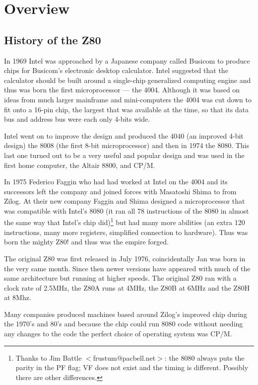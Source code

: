 \documentclass[oneside,a4paper]{book}
\begin{document}
\chapter{Overview}

\section{History of the Z80}

In 1969 Intel was approached by a Japanese company called Busicom to produce  chips for Busicom's electronic desktop calculator. Intel suggested that the calculator should be built around a single-chip generalized computing engine and thus was born the first microprocessor --- the 4004. Although it was based on ideas from much larger mainframe and mini-computers the 4004 was cut down to fit onto a 16-pin chip, the largest that was available at the time, so that its data bus and address bus were each only 4-bits wide. 

Intel went on to improve the design and produced the 4040 (an improved 4-bit design) the 8008 (the first 8-bit microprocessor) and then in 1974 the 8080. This last one turned out to be a very useful and popular design and was used in the first home computer, the Altair 8800, and CP/M. 

In 1975 Federico Faggin who had had worked at Intel on the 4004 and its successors left the company and joined forces with Masatoshi Shima to from Zilog. At their new company Faggin and Shima designed a microprocessor that was compatible with Intel's 8080 (it ran all 78 instructions of the 8080 in almost the same way that Intel's chip did)\footnote{Thanks to Jim Battle $<$frustum@pacbell.net$>$: the 8080 always puts the parity in the PF flag; VF does not exist and the timing is different. Possibly there are other differences.} but had many more abilities (an extra 120 instructions, many more registers, simplified connection to hardware). Thus was born the mighty Z80! and thus was the empire forged.

The original Z80 was first released in July 1976, coincidentally Jan was born in the very same month. Since then newer versions have appeared with much of the same architecture but running at higher speeds. The original Z80 ran with a clock rate of 2.5MHz, the Z80A runs at 4MHz, the Z80B at 6MHz and the Z80H at 8Mhz. 

Many companies produced machines based around Zilog's improved chip during the 1970's and 80's and because the chip could run 8080 code without needing any changes to the code the perfect choice of operating system was CP/M. 
\end{document}

